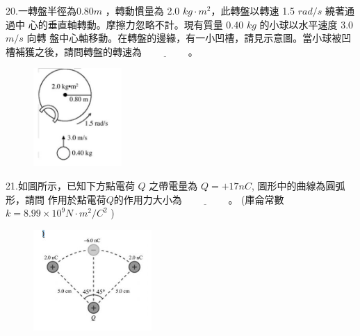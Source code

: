 \documentclass[cn,10pt,math=newtx]{elegantbook}
\begin{document}
\begin{example}
   20.一轉盤半徑為0.80$m$ ，轉動慣量為 2.0 $kg \cdot m^2$，此轉盤以轉速 1.5 $rad/s$ 繞著通過中
心的垂直軸轉動。摩擦力忽略不計。現有質量 0.40 $kg$ 的小球以水平速度 3.0 $m/s$ 向轉
盤中心軸移動。在轉盤的邊緣，有一小凹槽，請見示意圖。當小球被凹槽補獲之後，請問轉盤的轉速為$\underline{\hspace{2cm}}$。\\
    \rightline{[桃園聯招教甄109]}
\end{example}
\begin{solution}
    
\end{solution}
\begin{figure}[htbp]
    \flushright
    \includegraphics[width=0.3\textwidth]{image/109桃聯20.png}
  \end{figure}
\newpage


\begin{example}
   21.如圖所示，已知下方點電荷 $Q$ 之帶電量為 $Q = +17 nC$, 圖形中的曲線為圓弧形，請問 作用於點電荷$Q$的作用力大小為$\underline{\hspace{2cm}}$。 (庫侖常數 $k = 8.99 \times 10^9 N \cdot m^2/C^2$
)\\
    \rightline{[桃園聯招教甄109]}
\end{example}
\begin{solution}
    
\end{solution}
\begin{figure}[htbp]
    \flushright
    \includegraphics[width=0.4\textwidth]{image/109桃聯21.png}
  \end{figure}
\newpage
\end{document}
